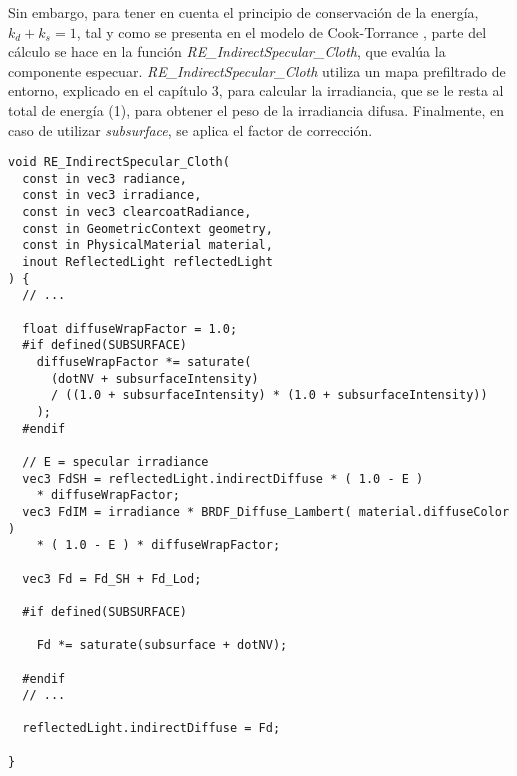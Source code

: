      Sin embargo, para tener en cuenta el principio de conservaci\'on de la energ\'ia, $k_d + k_s = 1$, tal y como se
      presenta en el modelo de Cook-Torrance \autocite{cooktorrance}, parte del c\'alculo se hace en la funci\'on
      \textit{RE\_IndirectSpecular\_Cloth}, que eval\'ua la componente especuar. \textit{RE\_IndirectSpecular\_Cloth}
      utiliza un mapa prefiltrado de entorno, explicado en el cap\'itulo 3, para calcular la irradiancia, que se le resta al
      total de energ\'ia (1), para obtener el peso de la irradiancia difusa. Finalmente, en caso de utilizar \textit{subsurface},
      se aplica el factor de correcci\'on.\\





      \begin{lstlisting}
void RE_IndirectSpecular_Cloth(
  const in vec3 radiance,
  const in vec3 irradiance,
  const in vec3 clearcoatRadiance,
  const in GeometricContext geometry,
  const in PhysicalMaterial material,
  inout ReflectedLight reflectedLight
) {
  // ...

  float diffuseWrapFactor = 1.0;
  #if defined(SUBSURFACE)
    diffuseWrapFactor *= saturate(
      (dotNV + subsurfaceIntensity)
      / ((1.0 + subsurfaceIntensity) * (1.0 + subsurfaceIntensity))
    );
  #endif

  // E = specular irradiance
  vec3 FdSH = reflectedLight.indirectDiffuse * ( 1.0 - E )
    * diffuseWrapFactor;
  vec3 FdIM = irradiance * BRDF_Diffuse_Lambert( material.diffuseColor )
    * ( 1.0 - E ) * diffuseWrapFactor;

  vec3 Fd = Fd_SH + Fd_Lod;

  #if defined(SUBSURFACE)

    Fd *= saturate(subsurface + dotNV);

  #endif
  // ...

  reflectedLight.indirectDiffuse = Fd;

}
      \end{lstlisting}

